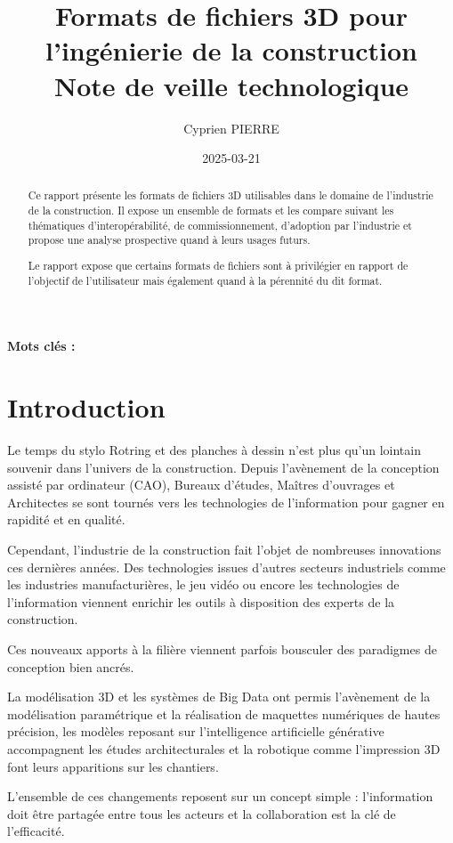 \documentclass[a4paper,12pt]{article}
\author{Cyprien PIERRE \orcidlink{0009-0009-9040-6795}}
\date{2025-03-21}
\title{Formats de fichiers 3D pour l'ingénierie de la construction\\\medskip
\large Note de veille technologique}
\begin{document}
\maketitle
\begin{abstract}
Ce rapport présente les formats de fichiers 3D utilisables dans le domaine de l'industrie de la construction. Il expose un ensemble de formats et les compare suivant les thématiques d'interopérabilité, de commissionnement, d'adoption par l'industrie et propose une analyse prospective quand à leurs usages futurs.

Le rapport expose que certains formats de fichiers sont à privilégier en rapport de l'objectif de l'utilisateur mais également quand à la pérennité du dit format.
\end{abstract}

\renewcommand\{\keywordsname\{\textbf{Mots clés : }
\section*{Introduction}
\label{sec:orgbd33560}

Le temps du stylo Rotring et des planches à dessin n'est plus qu'un lointain souvenir dans l'univers de la construction. Depuis l'avènement de la conception assisté par ordinateur (CAO), Bureaux d'études, Maîtres d'ouvrages et Architectes se sont tournés vers les technologies de l'information pour gagner en rapidité et en qualité.

Cependant, l'industrie de la construction fait l'objet de nombreuses innovations ces dernières années. Des technologies issues d'autres secteurs industriels comme les industries manufacturières, le jeu vidéo ou encore les technologies de l'information viennent enrichir les outils à disposition des experts de la construction. 

Ces nouveaux apports à la filière viennent parfois bousculer des paradigmes de conception bien ancrés.

La modélisation 3D et les systèmes de Big Data ont permis l'avènement de la modélisation paramétrique et la réalisation de maquettes numériques de hautes précision, les modèles reposant sur l'intelligence artificielle générative accompagnent les études architecturales et la robotique comme l'impression 3D font leurs apparitions sur les chantiers.

L'ensemble de ces changements reposent sur un concept simple : l'information doit être partagée entre tous les acteurs et la collaboration est la clé de l'efficacité.
\end{document}
